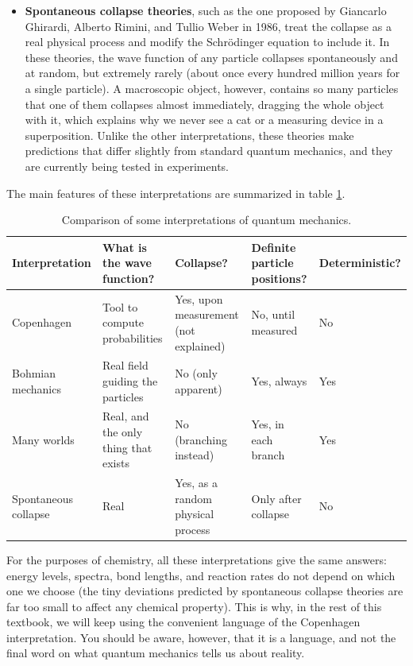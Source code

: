 \documentclass[
  english,
  9pt,
]{extbook}
\theoremstyle{definition}
\theoremstyle{definition}
\theoremstyle{definition}
\theoremstyle{definition}
\theoremstyle{remark}
\begin{document}
\begin{itemize}
\item
  \textbf{Spontaneous collapse theories}, such as the one proposed by Giancarlo Ghirardi, Alberto Rimini, and Tullio Weber in 1986, treat the collapse as a real physical process and modify the Schrödinger equation to include it. In these theories, the wave function of any particle collapses spontaneously and at random, but extremely rarely (about once every hundred million years for a single particle). A macroscopic object, however, contains so many particles that one of them collapses almost immediately, dragging the whole object with it, which explains why we never see a cat or a measuring device in a superposition. Unlike the other interpretations, these theories make predictions that differ slightly from standard quantum mechanics, and they are currently being tested in experiments.
\end{itemize}

The main features of these interpretations are summarized in table \ref{tab:tab1c8}.

\begin{table}

\caption{\label{tab:tab1c8}Comparison of some interpretations of quantum mechanics.}
\centering
\begin{tabular}[t]{l|l|l|l|l}
\hline
Interpretation & What is the wave function? & Collapse? & Definite particle positions? & Deterministic?\\
\hline
Copenhagen & Tool to compute probabilities & Yes, upon measurement (not explained) & No, until measured & No\\
\hline
Bohmian mechanics & Real field guiding the particles & No (only apparent) & Yes, always & Yes\\
\hline
Many worlds & Real, and the only thing that exists & No (branching instead) & Yes, in each branch & Yes\\
\hline
Spontaneous collapse & Real & Yes, as a random physical process & Only after collapse & No\\
\hline
\end{tabular}
\end{table}

For the purposes of chemistry, all these interpretations give the same answers: energy levels, spectra, bond lengths, and reaction rates do not depend on which one we choose (the tiny deviations predicted by spontaneous collapse theories are far too small to affect any chemical property). This is why, in the rest of this textbook, we will keep using the convenient language of the Copenhagen interpretation. You should be aware, however, that it is a language, and not the final word on what quantum mechanics tells us about reality.
\end{document}
